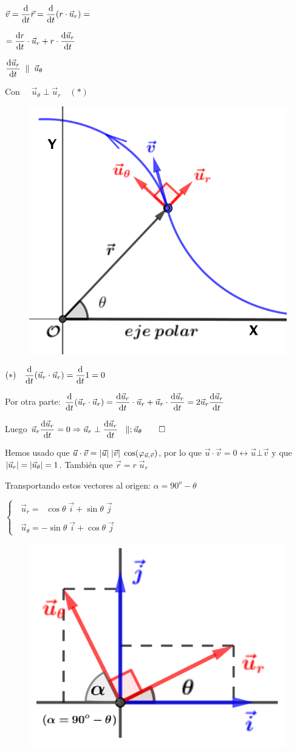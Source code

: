 \begin{multicols}{2}
$\displaystyle \vec v= \dv{t} \vec 
r = \dv{t} (r\cdot \vec u_r)= $

$\displaystyle=\dv{r}{t} \cdot \vec u_r + r \cdot \dv{\vec u_r}{t}$

$\displaystyle  \dv{\vec u_r}{t}  \; \parallel \;\vec u_\theta$

Con $\quad \vec u_\theta \; \bot \; \vec u_r \quad (*)$ 
\begin{figure}[H]
		\centering
		\includegraphics[width=.3\textwidth]{imagenes/imagenes02/T02IM03.png}
		\end{figure}
\end{multicols}

\begin{footnotesize}
\textcolor{gris}{$\displaystyle (*) \quad \dv{t} (\vec u_r \cdot \vec u_r)=\dv{t} 1=0$}

\textcolor{gris}{Por otra parte: $\displaystyle \dv{t} (\vec u_r \cdot \vec u_r)=\dv{\vec u_r}{t}\cdot \vec u_r+\vec u_r \cdot \dv{\vec u_r}{t}=2\vec u_r \dv{\vec u_r}{t}$}

\textcolor{gris}{Luego $\displaystyle \vec u_r \dv{\vec u_r}{t}=0 \Rightarrow \vec u_r \;\bot\; \dv{\vec u_r}{t}\;\ \parallel ;\vec u_\theta \qquad \Box$}

\textcolor{gris}{Hemos usado que $\vec u \cdot \vec v=\abs{\vec u} \;\abs{\vec v}\; \cos (\varphi_{\vec u, \vec v})$, por lo que $\vec u \cdot \vec v=0 \leftrightarrow \vec u \bot \vec v$ y que $\abs{\vec u_r}=\abs{\vec u_\theta}=1$. También que $\vec r=r\; \vec u_r$}
\end{footnotesize}

Transportando estos vectores al origen: \textcolor{gris}{$\alpha=90^o-\theta$}
\begin{multicols}{2}
$\begin{cases} \;\;\vec u_r=\;\;\cos \theta\; \vec i + \sin \theta\; \vec j \\ \\ \;\;\vec u_\theta = -\sin \theta \; \vec i + \cos \theta \;\vec j \end{cases}$
\begin{figure}[H]
		\centering
		\includegraphics[width=.25\textwidth]{imagenes/imagenes02/T02IM04.png}
		\end{figure}
\end{multicols}

